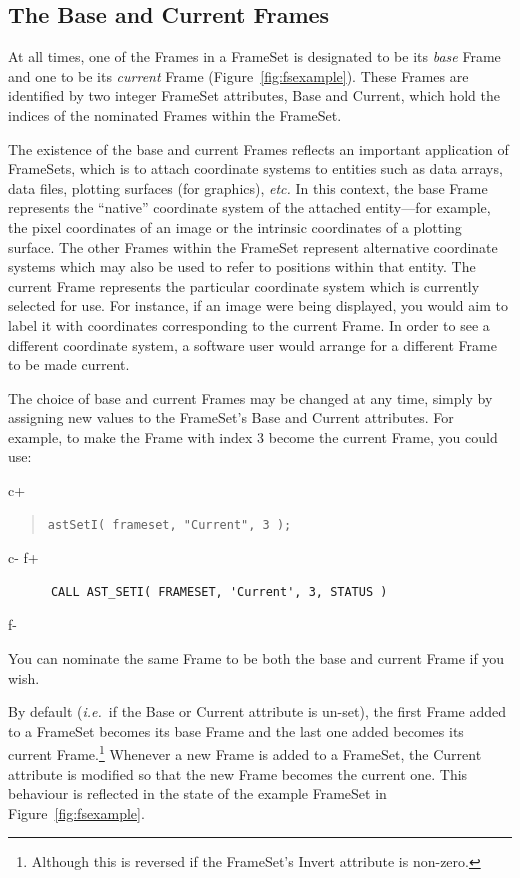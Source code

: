 \documentclass[twoside,11pt]{article}
\begin{document}
\subsection{\label{ss:baseandcurrent}The Base and Current Frames}

At all times, one of the Frames in a FrameSet is designated to be its
{\em{base}} Frame and one to be its {\em{current}} Frame
(Figure~\ref{fig:fsexample}). These Frames are identified by two
integer FrameSet attributes, Base and Current, which hold the indices
of the nominated Frames within the FrameSet.

The existence of the base and current Frames reflects an important
application of FrameSets, which is to attach coordinate systems to
entities such as data arrays, data files, plotting surfaces (for
graphics), {\em{etc.}}  In this context, the base Frame represents the
``native'' coordinate system of the attached entity---for example, the
pixel coordinates of an image or the intrinsic coordinates of a
plotting surface. The other Frames within the FrameSet represent
alternative coordinate systems which may also be used to refer to
positions within that entity.  The current Frame represents the
particular coordinate system which is currently selected for use. For
instance, if an image were being displayed, you would aim to label it
with coordinates corresponding to the current Frame. In order to see a
different coordinate system, a software user would arrange for a
different Frame to be made current.

The choice of base and current Frames may be changed at any time,
simply by assigning new values to the FrameSet's Base and Current
attributes. For example, to make the Frame with index 3 become the
current Frame, you could use:

c+
\begin{quote}
\small
\begin{verbatim}
astSetI( frameset, "Current", 3 );
\end{verbatim}
\normalsize
\end{quote}
c-
f+
\small
\begin{verbatim}
      CALL AST_SETI( FRAMESET, 'Current', 3, STATUS )
\end{verbatim}
\normalsize
f-

You can nominate the same Frame to be both the base and current Frame
if you wish.
\label{ss:baseandcurrentdefault}

By default ({\em{i.e.}}\ if the Base or Current attribute is un-set),
the first Frame added to a FrameSet becomes its base Frame and the
last one added becomes its current Frame.\footnote{Although this is
reversed if the FrameSet's Invert attribute is non-zero.} Whenever a
new Frame is added to a FrameSet, the Current attribute is modified so
that the new Frame becomes the current one. This behaviour is
reflected in the state of the example FrameSet in
Figure~\ref{fig:fsexample}.
\end{document}
